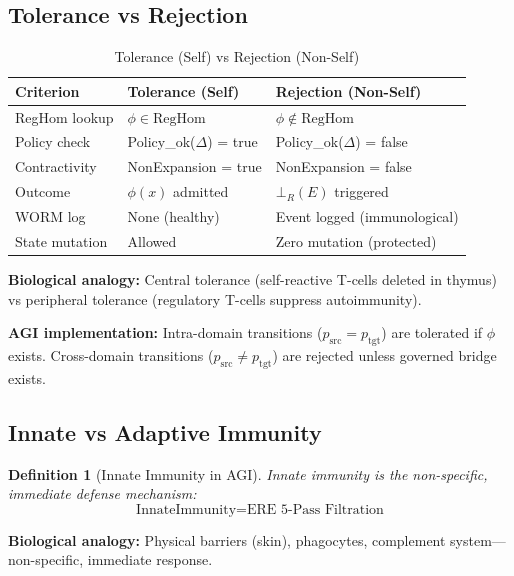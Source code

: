 \documentclass[11pt,a4paper]{article}
\newtheorem{definition}[theorem]{Definition}
\begin{document}
\subsection{Tolerance vs Rejection}

\begin{table}[h]
\centering
\caption{Tolerance (Self) vs Rejection (Non-Self)}
\label{tab:tolerance_rejection}
\begin{tabular}{@{}l l l@{}}
\toprule
\textbf{Criterion} & \textbf{Tolerance (Self)} & \textbf{Rejection (Non-Self)} \\
\midrule
RegHom lookup & $\phi \in \text{RegHom}$ & $\phi \notin \text{RegHom}$ \\
Policy check & Policy\_ok($\Delta$) = true & Policy\_ok($\Delta$) = false \\
Contractivity & NonExpansion = true & NonExpansion = false \\
Outcome & $\phi(x)$ admitted & $\bot_R(E)$ triggered \\
WORM log & None (healthy) & Event logged (immunological) \\
State mutation & Allowed & Zero mutation (protected) \\
\bottomrule
\end{tabular}
\end{table}

\textbf{Biological analogy:} Central tolerance (self-reactive T-cells deleted in thymus) vs peripheral tolerance (regulatory T-cells suppress autoimmunity).

\textbf{AGI implementation:} Intra-domain transitions ($p_{\text{src}} = p_{\text{tgt}}$) are tolerated if $\phi$ exists. Cross-domain transitions ($p_{\text{src}} \neq p_{\text{tgt}}$) are rejected unless governed bridge exists.

\subsection{Innate vs Adaptive Immunity}

\begin{definition}[Innate Immunity in AGI]
Innate immunity is the non-specific, immediate defense mechanism:
\begin{equation}
\text{InnateImmunity} = \text{ERE 5-Pass Filtration}
\end{equation}
\end{definition}

\textbf{Biological analogy:} Physical barriers (skin), phagocytes, complement system—non-specific, immediate response.
\end{document}
